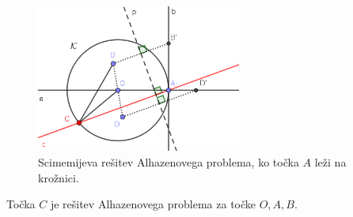\begin{figure}[h]
    \centering
    \includegraphics[width=0.6\textwidth]{images/alhazen/scimemi.png}
    \caption[Scimemijeva rešitev]{Scimemijeva rešitev Alhazenovega problema, ko točka $A$ leži na krožnici.}
    \label{fig:scimemi}
\end{figure}

\begin{trditev}
    Točka $C$ je rešitev Alhazenovega problema za točke $O, A, B$.
\end{trditev}


